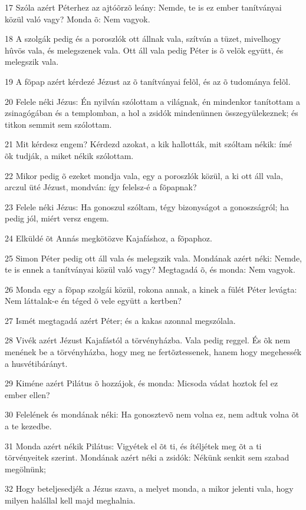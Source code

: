 \par 17 Szóla azért Péterhez az ajtóõrzõ leány: Nemde, te is ez ember tanítványai közül való vagy? Monda õ: Nem vagyok.
\par 18 A szolgák pedig és a poroszlók ott állnak vala, szítván a tüzet, mivelhogy hûvös vala, és melegszenek vala. Ott áll vala pedig Péter is õ velök együtt, és melegszik vala.
\par 19 A fõpap azért kérdezé Jézust az õ tanítványai felõl, és az õ tudománya felõl.
\par 20 Felele néki Jézus: Én nyilván szólottam a világnak, én mindenkor tanítottam a zsinagógában és a templomban, a hol a zsidók mindenünnen összegyülekeznek; és titkon semmit sem szólottam.
\par 21 Mit kérdesz engem? Kérdezd azokat, a kik hallották, mit szóltam nékik: ímé õk tudják, a miket nékik szólottam.
\par 22 Mikor pedig õ ezeket mondja vala, egy a poroszlók közül, a ki ott áll vala, arczul üté Jézust, mondván: így felelsz-é a fõpapnak?
\par 23 Felele néki Jézus: Ha gonoszul szóltam, tégy bizonyságot a gonoszságról; ha pedig jól, miért versz engem.
\par 24 Elküldé õt Annás megkötözve Kajafáshoz, a fõpaphoz.
\par 25 Simon Péter pedig ott áll vala és melegszik vala. Mondának azért néki: Nemde, te is ennek a tanítványai közül való vagy? Megtagadá õ, és monda: Nem vagyok.
\par 26 Monda egy a fõpap szolgái közül, rokona annak, a kinek a fülét Péter levágta: Nem láttalak-e én téged õ vele együtt a kertben?
\par 27 Ismét megtagadá azért Péter; és a kakas azonnal megszólala.
\par 28 Vivék azért Jézust Kajafástól a törvényházba. Vala pedig reggel. És õk nem menének be a törvényházba, hogy meg ne fertõztessenek,  hanem hogy megehessék a husvétibárányt.
\par 29 Kiméne azért Pilátus õ hozzájok, és monda: Micsoda vádat hoztok fel ez ember ellen?
\par 30 Felelének és mondának néki: Ha gonosztevõ nem volna ez, nem adtuk volna õt a te kezedbe.
\par 31 Monda azért nékik Pilátus: Vigyétek el õt ti, és ítéljétek meg õt a ti törvényeitek szerint. Mondának azért néki a zsidók: Nékünk senkit sem szabad megölnünk;
\par 32 Hogy beteljesedjék a Jézus szava, a melyet monda, a mikor jelenti vala, hogy milyen halállal kell majd meghalnia.
